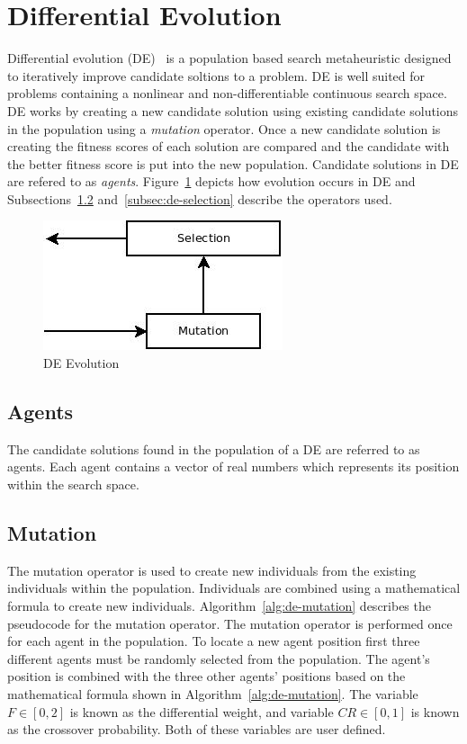 \section{Differential Evolution}
\label{sec:de}

Differential evolution (DE)~\cite{storn1997differential} is a population based search metaheuristic designed to iteratively improve candidate soltions to a problem. DE is well suited for problems containing a nonlinear and non-differentiable continuous search space. DE works by creating a new candidate solution using existing candidate solutions in the population using a \textit{mutation} operator. Once a new candidate solution is creating the fitness scores of each solution are compared and the candidate with the better fitness score is put into the new population. Candidate solutions in DE are refered to as \textit{agents}. Figure~\ref{fig:deFlowchart} depicts how evolution occurs in DE and Subsections~\ref{subsec:de-mutation} and~\ref{subsec:de-selection} describe the operators used.

\begin{figure}[H]
  \centering
  \includegraphics[bb=0 0 266 144,scale=0.5]{figures/DE.jpeg}
  \caption{DE Evolution}
  \label{fig:deFlowchart}
\end{figure}

\subsection{Agents}

The candidate solutions found in the population of a DE are referred to as agents. Each agent contains a vector of real numbers which represents its position within the search space.

\subsection{Mutation}
\label{subsec:de-mutation}

The mutation operator is used to create new individuals from the existing individuals within the population. Individuals are combined using a mathematical formula to create new individuals. Algorithm~\ref{alg:de-mutation} describes the pseudocode for the mutation operator. The mutation operator is performed once for each agent in the population. To locate a new agent position first three different agents must be randomly selected from the population. The agent's position is combined with the three other agents' positions based on the mathematical formula shown in Algorithm~\ref{alg:de-mutation}. The variable $F \in [0,2]$ is known as the differential weight, and variable $CR \in [0,1]$ is known as the crossover probability. Both of these variables are user defined.

